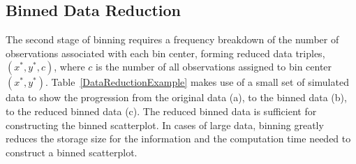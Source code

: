 \documentclass[11pt]{isuthesis}\usepackage[]{graphicx}\usepackage[]{color}
\begin{document}

\subsection{Binned Data Reduction}

The second stage of binning requires a frequency breakdown of the number of observations associated with each bin center, forming reduced data triples, $(x^\ast, y^\ast, c)$, where $c$ is the number of all observations assigned to bin center $(x^\ast,y^\ast)$. Table~\ref{DataReductionExample} makes use of a small set of simulated data to show the progression from the original data (a), to the binned data (b), to the reduced binned data (c). The reduced binned data is sufficient for constructing the binned scatterplot. In cases of large data, binning greatly reduces the storage size for the information and the computation time needed to construct a binned scatterplot.
\end{document}
